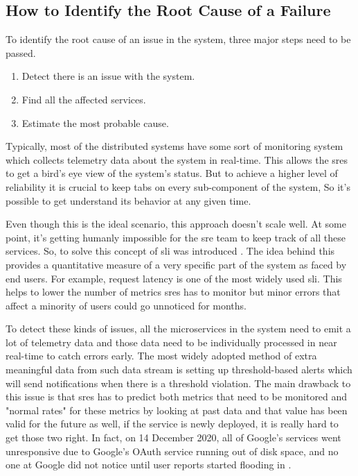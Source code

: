 \subsection{How to Identify the Root Cause of a Failure}\label{sec:how-root-cause}


To identify the root cause of an issue in the system, three major steps need to be passed.
\begin{enumerate}
\item Detect there is an issue with the system.
\item Find all the affected services.
\item Estimate the most probable cause.
\end{enumerate}

Typically, most of the distributed systems have some sort of monitoring system which collects telemetry data about the system in real-time. This allows the \acp{sre} to get a bird's eye view of the system's status. But to achieve a higher level of reliability it is crucial to keep tabs on every sub-component of the system, So it's possible to get understand its behavior at any given time. 

Even though this is the ideal scenario, this approach doesn't scale well. At some point, it's getting humanly impossible for the \ac{sre} team to keep track of all these services. So, to solve this concept of \ac{sli} was introduced \citep{beyer2016site}. The idea behind this provides a quantitative measure of a very specific part of the system as faced by end users. For example, request latency is one of the most widely used \ac{sli}. This helps to lower the number of metrics \acp{sre} has to monitor but minor errors that affect a minority of users could go unnoticed for months. 

To detect these kinds of issues, all the microservices in the system need to emit a lot of telemetry data and those data need to be individually processed in near real-time to catch errors early. The most widely adopted method of extra meaningful data from such data stream is setting up threshold-based alerts which will send notifications when there is a threshold violation. The main drawback to this issue is that \acp{sre} has to predict both metrics that need to be monitored and "normal rates" for these metrics by looking at past data and that value has been valid for the future as well, if the service is newly deployed, it is really hard to get those two right. In fact, on 14 December 2020, all of Google's services went unresponsive due to Google's OAuth service running out of disk space, and no one at Google did not notice until user reports started flooding in \citep{Googleoutage:online}. 


